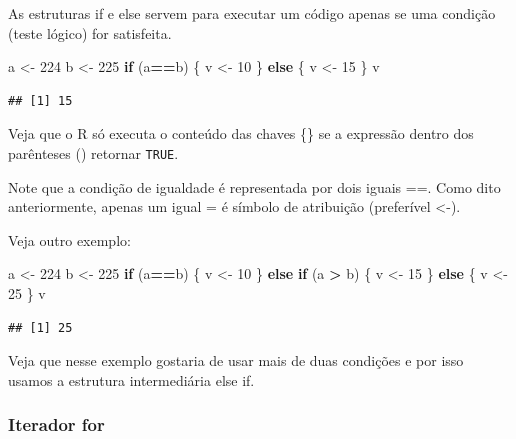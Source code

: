 \documentclass[
]{book}
\newenvironment{Shaded}{\begin{snugshade}}{\end{snugshade}}
\newcommand{\ControlFlowTok}[1]{\textcolor[rgb]{0.13,0.29,0.53}{\textbf{#1}}}
\newcommand{\DecValTok}[1]{\textcolor[rgb]{0.00,0.00,0.81}{#1}}
\newcommand{\NormalTok}[1]{#1}
\newcommand{\OperatorTok}[1]{\textcolor[rgb]{0.81,0.36,0.00}{\textbf{#1}}}
\newcommand{\StringTok}[1]{\textcolor[rgb]{0.31,0.60,0.02}{#1}}
\begin{document}
As estruturas if e else servem para executar um código apenas se uma condição (teste lógico) for satisfeita.

\begin{Shaded}
\begin{Highlighting}[]
\NormalTok{a <-}\StringTok{ }\DecValTok{224}
\NormalTok{b <-}\StringTok{ }\DecValTok{225}
\ControlFlowTok{if}\NormalTok{ (a}\OperatorTok{==}\NormalTok{b) \{ }
\NormalTok{  v <-}\StringTok{ }\DecValTok{10}
\NormalTok{\} }\ControlFlowTok{else}\NormalTok{ \{}
\NormalTok{  v <-}\StringTok{ }\DecValTok{15}
\NormalTok{  \}}
\NormalTok{v}
\end{Highlighting}
\end{Shaded}

\begin{verbatim}
## [1] 15
\end{verbatim}

Veja que o R só executa o conteúdo das chaves \{\} se a expressão dentro dos parênteses () retornar \texttt{TRUE}.

Note que a condição de igualdade é representada por dois iguais ==. Como dito anteriormente, apenas um igual = é símbolo de atribuição (preferível \textless-).

Veja outro exemplo:

\begin{Shaded}
\begin{Highlighting}[]
\NormalTok{a <-}\StringTok{ }\DecValTok{224}
\NormalTok{b <-}\StringTok{ }\DecValTok{225}
\ControlFlowTok{if}\NormalTok{ (a}\OperatorTok{==}\NormalTok{b) \{ }
\NormalTok{  v <-}\StringTok{ }\DecValTok{10}
\NormalTok{\} }\ControlFlowTok{else} \ControlFlowTok{if}\NormalTok{ (a }\OperatorTok{>}\StringTok{ }\NormalTok{b) \{}
\NormalTok{  v <-}\StringTok{ }\DecValTok{15}
\NormalTok{  \} }\ControlFlowTok{else}\NormalTok{ \{}
\NormalTok{    v <-}\StringTok{ }\DecValTok{25}
\NormalTok{    \}}
\NormalTok{v}
\end{Highlighting}
\end{Shaded}

\begin{verbatim}
## [1] 25
\end{verbatim}

Veja que nesse exemplo gostaria de usar mais de duas condições e por isso usamos a estrutura intermediária else if.

\hypertarget{iterador-for}{%
\subsubsection{Iterador for}\label{iterador-for}}
\end{document}
